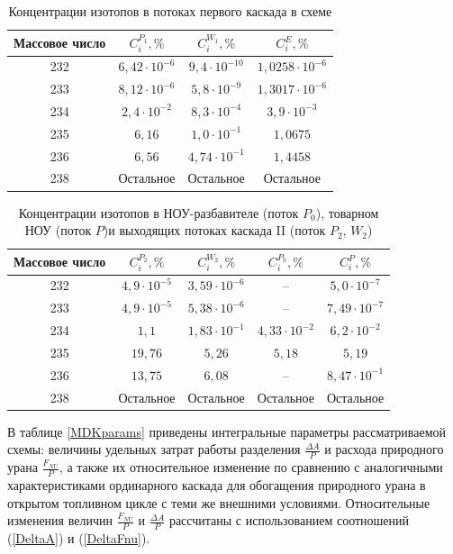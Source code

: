 {    \begin{table}[ht]
\begin{tabular}{|c|c|c|c|}
    \hline Массовое число & $C_{i}^{P_{1}}, \%$ & $C_{i}^{W_{1}}, \%$ & $C_{i}^{E}, \%$\\\hline 
    232 & $6,42\cdot10^{-6}$ & $9,4\cdot10^{-10}$ & $1,0258\cdot10^{-6}$\\
    233 & $8,12\cdot10^{-6}$ & $5,8\cdot10^{-9}$ & $1,3017\cdot10^{-6}$\\
    234 & $2,4\cdot10^{-2}$ & $8,3\cdot10^{-4}$ & $3,9\cdot10^{-3}$\\
    235 & $6,16$ & $1,0\cdot10^{-1}$ & $1,0675$\\
    236 & $6,56$ & $4,74\cdot10^{-1}$ & $1,4458$\\
    238 & Остальное & Остальное & Остальное\\
    \hline
\end{tabular}
\caption{Концентрации изотопов в потоках первого каскада в схеме}\label{MDKcas1params}
\end{table}

\begin{table}[ht]
    \begin{tabular}{|c|c|c|c|c|}
        \hline Массовое число & $C_{i}^{P_{2}}, \%$ & $C_{i}^{W_{2}}, \%$ & $C_{i}^{P_{0}}, \%$ & $C_{i}^{P}, \%$\\
        \hline 232 & $4,9\cdot10^{-5}$ & $3,59\cdot10^{-6}$ & -- & $5,0\cdot10^{-7}$\\
        233 & $4,9\cdot10^{-5}$ & $5,38\cdot10^{-6}$ & -- & $7,49\cdot10^{-7}$\\
        234 & $1,1$ & $1,83\cdot10^{-1}$ & $4,33\cdot10^{-2}$ & $6,2\cdot10^{-2}$\\
        235 & $19,76$ & $5,26$ & $5,18$  & $5,19$\\
        236 & $13,75$ & $6,08$ & --  & $8,47\cdot10^{-1}$\\
        238 & Остальное & Остальное & Остальное  & Остальное\\
        \hline
\end{tabular}
\caption{Концентрации изотопов в НОУ-разбавителе (поток $P_{0}$), товарном НОУ (поток $P$)и выходящих потоках каскада II (поток $P_{2}$, $W_{2}$)}\label{MDKcas2params}
\end{table}

В таблице \ref{MDKparams} приведены интегральные параметры рассматриваемой схемы: величины удельных затрат работы разделения $\frac{\Delta A}{P}$ и расхода природного урана $\frac{F_{NU}}{P}$, а также их относительное изменение по сравнению с аналогичными характеристиками ординарного каскада для обогащения природного урана в открытом топливном цикле с теми же внешними условиями. Относительные изменения величин $\frac{F_{NU}}{P}$ и $\frac{\Delta A}{P}$ рассчитаны с использованием соотношений (\ref{DeltaA}) и (\ref{DeltaFnu}).

}
